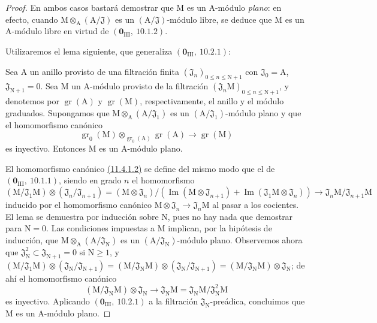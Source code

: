 \begin{proof}
En ambos casos bastará demostrar que $\mathrm{M}$ es un $\mathrm{A}$-módulo \emph{plano}: en efecto,
cuando $\mathrm{M}\otimes_\mathrm{A}(\mathrm{A}/\mathfrak{J})$ es un $(\mathrm{A}/\mathfrak{J})$-módulo libre, se deduce que $\mathrm{M}$ es un $\mathrm{A}$-módulo
libre en virtud de $(\mathbf{0}_{\mathrm{III}},~10.1.2)$.

Utilizaremos el lema siguiente, que generaliza $(\mathbf{0}_{\mathrm{III}},~10.2.1)$:

\begin{lemma}[11.4.1.1]
\label{IV.11.4.1.1}
Sea $\mathrm{A}$ un anillo provisto de una filtración finita $(\mathfrak{J}_n)_{0\leq n\leq\mathrm{N}+1}$ con
$\mathfrak{J}_0=\mathrm{A}$, $\mathfrak{J}_{\mathrm{N}+1}=0$. Sea $\mathrm{M}$ un $\mathrm{A}$-módulo provisto de la filtración $(\mathfrak{J}_n\mathrm{M})_{0\leq n\leq\mathrm{N}+1}$, y denotemos
por $\operatorname{gr}(\mathrm{A})$ y $\operatorname{gr}(\mathrm{M})$, respectivamente, el anillo y el módulo graduados. Supongamos que $\mathrm{M}\otimes_\mathrm{A}(\mathrm{A}/\mathfrak{J}_1)$
es un $(\mathrm{A}/\mathfrak{J}_1)$-módulo plano y que el homomorfismo canónico
\[
\label{IV.11.4.1.2}
\operatorname{gr}_0(\mathrm{M})\otimes_{\operatorname{gr}_0(\mathrm{A})}\operatorname{gr}(\mathrm{A}) \to \operatorname{gr}(\mathrm{M})
\tag{11.4.1.2}
\]
es inyectivo. Entonces $\mathrm{M}$ es un $\mathrm{A}$-módulo plano.
\end{lemma}

El homomorfismo canónico {\hyperlink{ega4.c04.lem.11-4-1-2}{(11.4.1.2)}} se define del mismo modo que
el de $(\mathbf{0}_{\mathrm{III}},~10.1.1)$, siendo en grado $n$ el homomorfismo
\[
(\mathrm{M}/\mathfrak{J}_1\mathrm{M})\otimes(\mathfrak{J}_n/\mathfrak{J}_{n+1})=(\mathrm{M}\otimes\mathfrak{J}_n)/(\operatorname{Im}(\mathrm{M}\otimes\mathfrak{J}_{n+1})+\operatorname{Im}(\mathfrak{J}_1\mathrm{M}\otimes\mathfrak{J}_n))\to\mathfrak{J}_n\mathrm{M}/\mathfrak{J}_{n+1}\mathrm{M}
\]
inducido por el homomorfismo canónico $\mathrm{M}\otimes\mathfrak{J}_n\to\mathfrak{J}_n\mathrm{M}$ al pasar a los cocientes.
El lema se demuestra por inducción sobre $\mathrm{N}$, pues no hay nada que demostrar para $\mathrm{N}=0$.
Las condiciones impuestas a $\mathrm{M}$ implican, por la hipótesis de inducción, que $\mathrm{M}\otimes_\mathrm{A}(\mathrm{A}/\mathfrak{J}_\mathrm{N})$
es un $(\mathrm{A}/\mathfrak{J}_\mathrm{N})$-módulo plano. Observemos ahora que $\mathfrak{J}_\mathrm{N}^2\subset\mathfrak{J}_{\mathrm{N}+1}=0$ si $\mathrm{N}\geq 1$, y
$(\mathrm{M}/\mathfrak{J}_1\mathrm{M})\otimes(\mathfrak{J}_\mathrm{N}/\mathfrak{J}_{\mathrm{N}+1})=(\mathrm{M}/\mathfrak{J}_\mathrm{N}\mathrm{M})\otimes(\mathfrak{J}_\mathrm{N}/\mathfrak{J}_{\mathrm{N}+1})=(\mathrm{M}/\mathfrak{J}_\mathrm{N}\mathrm{M})\otimes\mathfrak{J}_\mathrm{N}$; de ahí el homomorfismo canónico
\[
(\mathrm{M}/\mathfrak{J}_\mathrm{N}\mathrm{M})\otimes\mathfrak{J}_\mathrm{N} \to \mathfrak{J}_\mathrm{N}\mathrm{M}=\mathfrak{J}_\mathrm{N}\mathrm{M}/\mathfrak{J}_\mathrm{N}^2\mathrm{M}
\]
es inyectivo. Aplicando $(\mathbf{0}_{\mathrm{III}},~10.2.1)$ a la filtración $\mathfrak{J}_\mathrm{N}$-preádica, concluimos que
$\mathrm{M}$ es un $\mathrm{A}$-módulo plano.


\end{proof}
